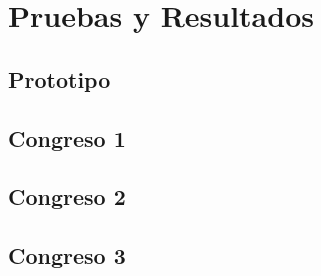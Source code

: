 \chapter{Pruebas y Resultados}
\label{chap:testresults}

\section{Prototipo}

\section{Congreso 1}

\section{Congreso 2}

\section{Congreso 3}
